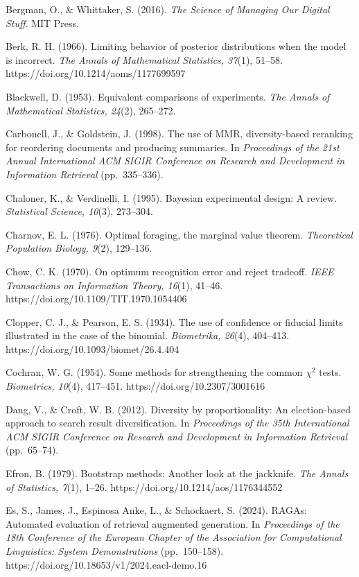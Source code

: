 \documentclass[
  11pt]{article}
\begin{document}
Bergman, O., \& Whittaker, S. (2016). \emph{The Science of Managing Our
Digital Stuff}. MIT Press.

Berk, R. H. (1966). Limiting behavior of posterior distributions when
the model is incorrect. \emph{The Annals of Mathematical Statistics,
37}(1), 51--58. https://doi.org/10.1214/aoms/1177699597

Blackwell, D. (1953). Equivalent comparisons of experiments. \emph{The
Annals of Mathematical Statistics, 24}(2), 265--272.

Carbonell, J., \& Goldstein, J. (1998). The use of MMR, diversity-based
reranking for reordering documents and producing summaries. In
\emph{Proceedings of the 21st Annual International ACM SIGIR Conference
on Research and Development in Information Retrieval} (pp.~335--336).

Chaloner, K., \& Verdinelli, I. (1995). Bayesian experimental design: A
review. \emph{Statistical Science, 10}(3), 273--304.

Charnov, E. L. (1976). Optimal foraging, the marginal value theorem.
\emph{Theoretical Population Biology, 9}(2), 129--136.

Chow, C. K. (1970). On optimum recognition error and reject tradeoff.
\emph{IEEE Transactions on Information Theory, 16}(1), 41--46.
https://doi.org/10.1109/TIT.1970.1054406

Clopper, C. J., \& Pearson, E. S. (1934). The use of confidence or
fiducial limits illustrated in the case of the binomial.
\emph{Biometrika, 26}(4), 404--413.
https://doi.org/10.1093/biomet/26.4.404

Cochran, W. G. (1954). Some methods for strengthening the common
\(\chi^2\) tests. \emph{Biometrics, 10}(4), 417--451.
https://doi.org/10.2307/3001616

Dang, V., \& Croft, W. B. (2012). Diversity by proportionality: An
election-based approach to search result diversification. In
\emph{Proceedings of the 35th International ACM SIGIR Conference on
Research and Development in Information Retrieval} (pp.~65--74).

Efron, B. (1979). Bootstrap methods: Another look at the jackknife.
\emph{The Annals of Statistics, 7}(1), 1--26.
https://doi.org/10.1214/aos/1176344552

Es, S., James, J., Espinosa Anke, L., \& Schockaert, S. (2024). RAGAs:
Automated evaluation of retrieval augmented generation. In
\emph{Proceedings of the 18th Conference of the European Chapter of the
Association for Computational Linguistics: System Demonstrations}
(pp.~150--158). https://doi.org/10.18653/v1/2024.eacl-demo.16
\end{document}
